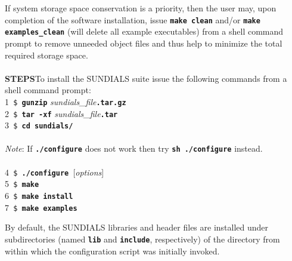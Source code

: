 If system storage space conservation is a priority, then the user may, upon completion of the software installation, issue \texttt{\textbf{make clean}} and/or \texttt{\textbf{make examples\_clean}} (will delete all example executables) from a shell command prompt to remove unneeded object files and thus help to minimize the total required storage space.
\\
\\
\setlength{\parindent}{0cm}
\small\textbf{STEPS}\normalsize\hspace*{2ex}To install the \small SUNDIALS \normalsize suite issue the following commands from a shell command prompt:
\\
\small 1\normalsize\texttt{ \$\textbf{ gunzip}}\textit{ sundials\_file}\texttt{\textbf{.tar.gz}} \\
\small 2\normalsize\texttt{ \$\textbf{ tar -xf}}\textit{ sundials\_file}\texttt{\textbf{.tar}} \\
\small 3\normalsize\texttt{ \$\textbf{ cd}}\texttt{\textbf{ sundials/}} \\
\\
\textit{Note}: If \texttt{\textbf{./configure}} does not work then try \texttt{\textbf{sh ./configure}} instead. \\
\\
\small 4\normalsize\texttt{ \$\textbf{ ./configure }}[\textit{options}] \\
\small 5\normalsize\texttt{ \$\textbf{ make}} \\
\small 6\normalsize\texttt{ \$\textbf{ make install}} \\
\small 7\normalsize\texttt{ \$\textbf{ make examples}} \\ \setlength{\parindent}{0.5cm}

By default, the \small SUNDIALS \normalsize libraries and header files are installed under subdirectories (named \texttt{\textbf{lib}} and \texttt{\textbf{include}}, respectively) of the directory from within which the configuration script was initially invoked.
\\

